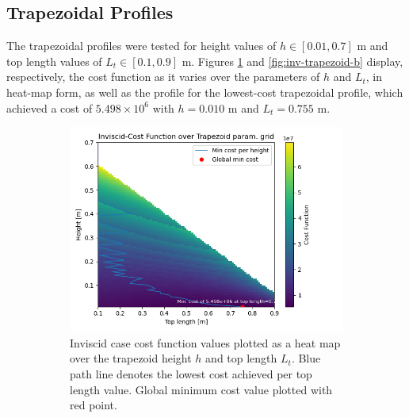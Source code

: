 \documentclass[11pt]{article}
\begin{document}
\subsection{Trapezoidal Profiles}
The trapezoidal profiles were tested for height values of $h \in [0.01, 0.7]\text{ m}$ and top length values of $L_t \in [0.1, 0.9]\text{ m}$. Figures \ref{fig:inv-trapezoid-a} and \ref{fig:inv-trapezoid-b} display, respectively, the cost function as it varies over the parameters of $h$ and $L_t$, in heat-map form, as well as the profile for the lowest-cost trapezoidal profile, which achieved a cost of $5.498\times 10^6$ with $h=0.010 \text{ m}$ and $L_t=0.755 \text{ m}$.
\begin{figure}[H]
\centering
\begin{subfigure}[b]{0.54\textwidth}
    \centering
    \includegraphics[width=\linewidth]{../results/inviscid/trapezoids.png}
    \caption{Inviscid case cost function values plotted as a heat map over the trapezoid height $h$ and top length $L_t$. Blue path line denotes the lowest cost achieved per top length value. Global minimum cost value plotted with red point.}
    \label{fig:inv-trapezoid-a}
\end{subfigure}
\hfill
\begin{subfigure}[b]{0.44\textwidth}
    \centering

\end{subfigure}
\end{figure}
\end{document}
